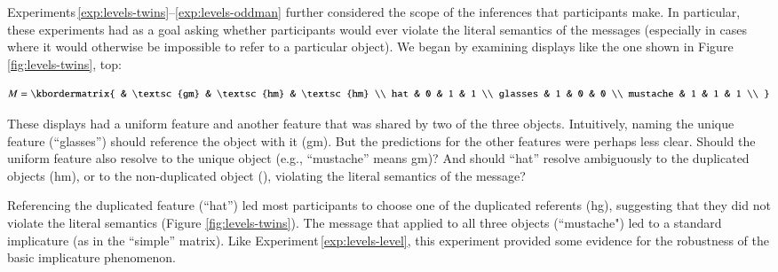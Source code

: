 \documentclass[man,noapacite]{apa2}
\newcounter{Experiment}
\newcommand{\exptref}[1]{Experiment\,\ref{#1}}
\newcommand{\exptrefrange}[2]{Experiments\,\ref{#1}--\ref{#2}}
\begin{document}
\exptrefrange{exp:levels-twins}{exp:levels-oddman} further considered the scope of the inferences that participants make. In particular, these experiments had as a goal asking whether participants would ever violate the literal semantics of the messages (especially in cases where it would otherwise be impossible to refer to a particular object). We began by examining displays like the one shown in Figure \ref{fig:levels-twins}, top:

\begin{equation}
    M = \kbordermatrix{
               & \textsc{gm} & \textsc{hm} & \textsc{hm} \\
      hat      & 0  & 1  & 1  \\
      glasses  & 1  & 0  & 0 \\
      mustache & 1  & 1  & 1 \\
    }
\end{equation}

\noindent These displays had a uniform feature and another feature that was shared by two of the three objects. Intuitively, naming the unique feature (``glasses'') should reference the object with it ({\sc gm}). But the predictions for the other features were perhaps less clear. Should the uniform feature also resolve to the unique object (e.g., ``mustache'' means {\sc gm})? And should ``hat'' resolve ambiguously to the duplicated objects ({\sc hm}), or to the non-duplicated object ({\gm}), violating the literal semantics of the message?

Referencing the duplicated feature (``hat'') led most participants to choose one of the duplicated referents ({\sc hg}), suggesting that they did not violate the literal semantics (Figure \ref{fig:levels-twins}). The message that applied to all three objects (``mustache") led to a standard implicature (as in the ``simple'' matrix). Like \exptref{exp:levels-level}, this experiment provided some evidence for the robustness of the basic implicature phenomenon.
\end{document}
